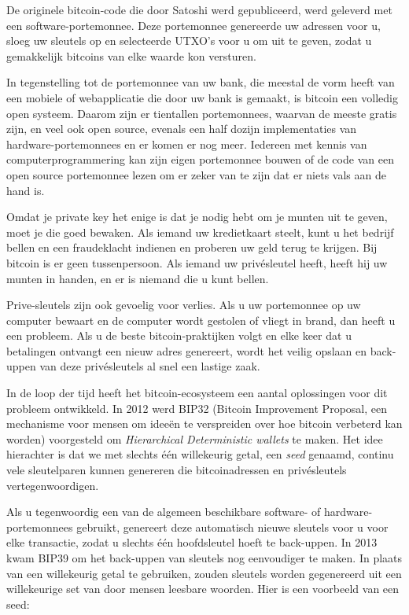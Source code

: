 De originele bitcoin-code die door Satoshi werd gepubliceerd, werd geleverd met een software-portemonnee. Deze portemonnee genereerde uw adressen voor u, sloeg uw sleutels op en selecteerde UTXO's voor u om uit te geven, zodat u gemakkelijk bitcoins van elke waarde kon versturen. 

In tegenstelling tot de portemonnee van uw bank, die meestal de vorm heeft van een mobiele of webapplicatie die door uw bank is gemaakt, is bitcoin een volledig open systeem. Daarom zijn er tientallen portemonnees, waarvan de meeste gratis zijn, en veel ook open source, evenals een half dozijn implementaties van hardware-portemonnees en er komen er nog meer. Iedereen met kennis van computerprogrammering kan zijn eigen portemonnee bouwen of de code van een open source portemonnee lezen om er zeker van te zijn dat er niets vals aan de hand is. 

Omdat je private key het enige is dat je nodig hebt om je munten uit te geven, moet je die goed bewaken. Als iemand uw kredietkaart steelt, kunt u het bedrijf bellen en een fraudeklacht indienen en proberen uw geld terug te krijgen. Bij bitcoin is er geen tussenpersoon. Als iemand uw privésleutel heeft, heeft hij uw munten in handen, en er is niemand die u kunt bellen. 

Prive-sleutels zijn ook gevoelig voor verlies. Als u uw portemonnee op uw computer bewaart en de computer wordt gestolen of vliegt in brand, dan heeft u een probleem. Als u de beste bitcoin-praktijken volgt en elke keer dat u betalingen ontvangt een nieuw adres genereert, wordt het veilig opslaan en back-uppen van deze privésleutels al snel een lastige zaak. 

In de loop der tijd heeft het bitcoin-ecosysteem een aantal oplossingen voor dit probleem ontwikkeld. In 2012 werd BIP32 (Bitcoin Improvement Proposal, een mechanisme voor mensen om ideeën te verspreiden over hoe bitcoin verbeterd kan worden) voorgesteld om \textit{Hierarchical Deterministic wallets} te maken. Het idee hierachter is dat we met slechts één willekeurig getal, een \textit{seed} genaamd, continu vele sleutelparen kunnen genereren die bitcoinadressen en privésleutels vertegenwoordigen. 

Als u tegenwoordig een van de algemeen beschikbare software- of hardware-portemonnees gebruikt, genereert deze automatisch nieuwe sleutels voor u voor elke transactie, zodat u slechts één hoofdsleutel hoeft te back-uppen. In 2013 kwam BIP39 om het back-uppen van sleutels nog eenvoudiger te maken. In plaats van een willekeurig getal te gebruiken, zouden sleutels worden gegenereerd uit een willekeurige set van door mensen leesbare woorden. 
\clearpage
Hier is een voorbeeld van een seed:

